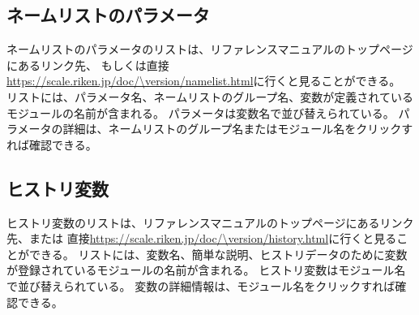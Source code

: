 \subsection{ネームリストのパラメータ}
ネームリストのパラメータのリストは、リファレンスマニュアルのトップページにあるリンク先、
もしくは直接\url{https://scale.riken.jp/doc/\version/namelist.html}に行くと見ることができる。
リストには、パラメータ名、ネームリストのグループ名、変数が定義されているモジュールの名前が含まれる。
パラメータは変数名で並び替えられている。
パラメータの詳細は、ネームリストのグループ名またはモジュール名をクリックすれば確認できる。


\subsection{ヒストリ変数}
ヒストリ変数のリストは、リファレンスマニュアルのトップページにあるリンク先、または
直接\url{https://scale.riken.jp/doc/\version/history.html}に行くと見ることができる。
リストには、変数名、簡単な説明、ヒストリデータのために変数が登録されているモジュールの名前が含まれる。
ヒストリ変数はモジュール名で並び替えられている。
変数の詳細情報は、モジュール名をクリックすれば確認できる。
